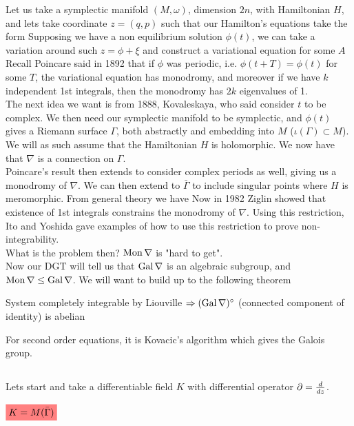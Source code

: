 \documentclass{article}
\begin{document}
Let us take a symplectic manifold $(M,\omega)$, dimension $2n$, with Hamiltonian $H$, and lets take coordinate $z=(q,p)$ such that our Hamilton's equations take the form 
Supposing we have a non equilibrium solution $\phi(t)$, we can take a variation around such $z = \phi + \xi$ and construct a variational equation 
for some $A$\\
Recall Poincare said in 1892 that if $\phi$ was periodic, i.e. $\phi(t+T) = \phi(t)$ for some $T$, the variational equation has monodromy, and moreover if we have $k$ independent 1st integrals, then the monodromy has $2k$ eigenvalues of 1. \\
The next idea we want is from 1888, Kovaleskaya, who said consider $t$ to be complex. We then need our symplectic manifold to be  symplectic, and $\phi(t)$ gives a Riemann surface $\Gamma$, both abstractly and embedding into $M$ ($\iota(\Gamma) \subset M$). We will as such assume that the Hamiltonian $H$ is holomorphic. We now have that $\nabla$ is a connection on $\Gamma$. \\
Poincare's result then extends to consider complex periods as well, giving us a monodromy of $\nabla$. We can then extend to $\bar{\Gamma}$ to include singular points where $H$ is meromorphic. From general theory we have 
Now in 1982 Ziglin showed that existence of 1st integrals constrains the monodromy of $\nabla$. Using this restriction, Ito and Yoshida gave examples of how to use this restriction to prove non-integrability. \\
What is the problem then? $\operatorname{Mon}\nabla$ is "hard to get". \\
Now our DGT will tell us that $\operatorname{Gal}\nabla$ is an algebraic subgroup, and $\operatorname{Mon}\nabla \leq \operatorname{Gal}\nabla$. We will want to build up to the following theorem 
\begin{theorem}
System completely integrable by Liouville $\Rightarrow (\operatorname{Gal}\nabla)^\circ$ (connected component of identity) is abelian
\end{theorem}
\noindent For second order equations, it is Kovacic's algorithm which gives the Galois group. 

\subsection{\secmath{\Gal\nabla}}
Lets start and take a differentiable field $K$ with differential operator $\partial = \frac{d}{dz}$. 
\begin{example}
$\highlight{K = M(\bar{\Gamma})}$
\end{example}
\end{document}
